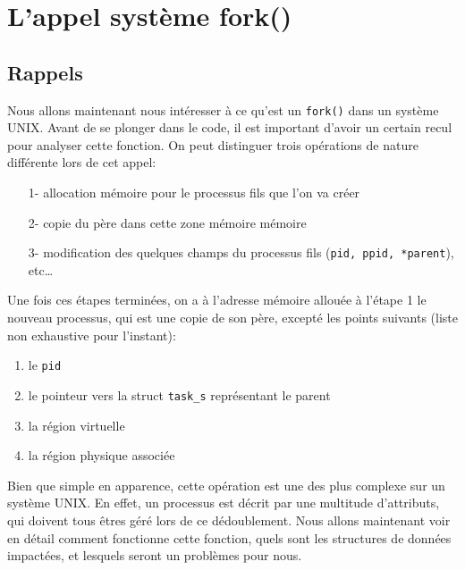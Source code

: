 \section{L'appel système fork()} \label{sec:fork}

  \subsection{Rappels}

    Nous allons maintenant nous intéresser à ce qu'est un \texttt{fork()} dans
    un système UNIX. Avant de se plonger dans le code, il est important d'avoir
    un certain recul pour analyser cette fonction. On peut distinguer trois
    opérations de nature différente lors de cet appel:

    \begin{enumerate}[1-]

      \item[1-] allocation mémoire pour le processus fils que l'on va créer

      \item[2-] copie du père dans cette zone mémoire mémoire

      \item[3-] modification des quelques champs du processus fils (\texttt{pid,
        ppid, *parent}), etc\ldots

    \end{enumerate}

    Une fois ces étapes terminées, on a à l'adresse mémoire allouée à l'étape 1
    le nouveau processus, qui est une copie de son père, excepté les points
    suivants (liste non exhaustive pour l'instant): 

    \begin{enumerate}[1-]

      \item le \texttt{pid}

      \item le pointeur vers la struct \texttt{task\_s} représentant le parent

      \item la région virtuelle

      \item la région physique associée

    \end{enumerate}

    Bien que simple en apparence, cette opération est une des plus complexe sur
    un système UNIX. En effet, un processus est décrit par une multitude
    d'attributs, qui doivent tous êtres géré lors de ce dédoublement. Nous
    allons maintenant voir en détail comment fonctionne cette fonction, quels
    sont les structures de données impactées, et lesquels seront un problèmes
    pour nous.


